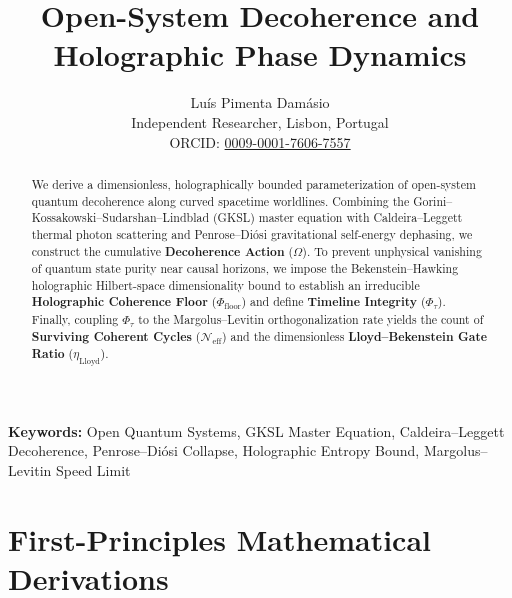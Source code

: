 \documentclass[11pt,a4paper]{article}
\title{\textbf{Open-System Decoherence and Holographic Phase Dynamics}}
\author{Lu\'{i}s {Pimenta Dam\'{a}sio}\\
\small Independent Researcher, Lisbon, Portugal\\
\small ORCID: \href{https://orcid.org/0009-0001-7606-7557}{0009-0001-7606-7557}}
\date{}
\begin{document}
\maketitle

\noindent\textbf{Keywords:} Open Quantum Systems, GKSL Master Equation, Caldeira--Leggett Decoherence, Penrose--Di\'{o}si Collapse, Holographic Entropy Bound, Margolus--Levitin Speed Limit

\vspace{0.5em}
\noindent{}

\begin{abstract}
We derive a dimensionless, holographically bounded parameterization of open-system quantum decoherence along curved spacetime worldlines. Combining the Gorini--Kossakowski--Sudarshan--Lindblad (GKSL) master equation with Caldeira--Leggett thermal photon scattering and Penrose--Di\'{o}si gravitational self-energy dephasing, we construct the cumulative \textbf{Decoherence Action} ($\Omega$). To prevent unphysical vanishing of quantum state purity near causal horizons, we impose the Bekenstein--Hawking holographic Hilbert-space dimensionality bound to establish an irreducible \textbf{Holographic Coherence Floor} ($\Phi_{\mathrm{floor}}$) and define \textbf{Timeline Integrity} ($\Phi_\tau$). Finally, coupling $\Phi_\tau$ to the Margolus--Levitin orthogonalization rate yields the count of \textbf{Surviving Coherent Cycles} ($\mathcal{N}_{\mathrm{eff}}$) and the dimensionless \textbf{Lloyd--Bekenstein Gate Ratio} ($\eta_{\mathrm{Lloyd}}$).
\end{abstract}

\section{First-Principles Mathematical Derivations}
\end{document}
